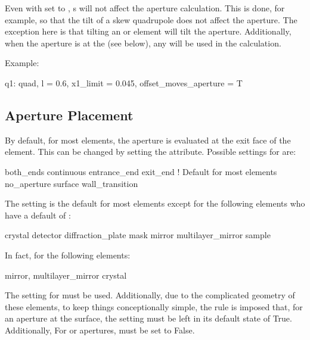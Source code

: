 Even with  set to , s will not affect the aperture
calculation. This is done, for example, so that the tilt of a skew quadrupole does not affect the
aperture. The exception here is that tilting an  or  element will
tilt the aperture. Additionally, when the aperture is at the  (see below), any 
will be used in the calculation.

Example:
\begin{example}
  q1: quad, l = 0.6, x1_limit = 0.045, offset_moves_aperture = T
\end{example}

\subsection{Aperture Placement}
\label{s:ap.place}

By default, for most elements, the aperture is evaluated at the exit face of the element. This can
be changed by setting the  attribute.  Possible settings for  are:
\begin{example}
  both_ends
  continuous
  entrance_end
  exit_end       ! Default for most elements
  no_aperture
  surface  
  wall_transition
\end{example}
The  setting is the default for most elements except for
the following elements who have a default of :
\begin{example}
  crystal
  detector
  diffraction_plate
  mask
  mirror
  multilayer_mirror
  sample
\end{example}

In fact, for the following elements:
\begin{example}
  mirror, 
  multilayer_mirror
  crystal
\end{example}
The  setting for  must be used.  Additionally, due to the complicated
geometry of these elements, to keep things conceptionally simple, the rule is imposed that, for an
aperture at the surface, the  setting must be left in its default state of
True. Additionally, For  or  apertures, 
must be set to False.

